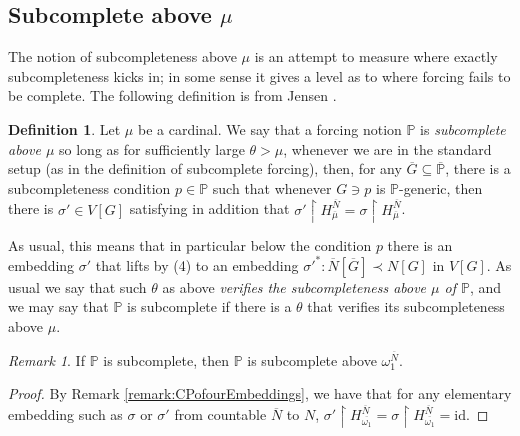 \documentclass{amsart}
\theoremstyle{definition}
\newtheorem{definition}[theorem]{Definition}
\theoremstyle{remark}
\newtheorem{remark}[theorem]{Remark}
\renewcommand{\P}{\mathbb{P}}
\newcommand{\N}{{\overline{N}}}
\newcommand{\G}{\overline{G}}
\newcommand{\rest}{\mathbin{\upharpoonright}}
\begin{document}
\subsection{Subcomplete above $\mu$}
The notion of subcompleteness above $\mu$ is an attempt to measure where exactly subcompleteness kicks in; in some sense it gives a level as to where forcing fails to be complete. The following definition is from Jensen \cite[Chapter 2 p.\ 47]{Jensen:2009fe}.
\begin{definition} 
Let $\mu$ be a cardinal. We say that a forcing notion $\P$ is \emph{subcomplete above $\mu$} so long as for sufficiently large $\theta > \mu$, whenever we are in the standard setup (as in the definition of subcomplete forcing),
then, for any $\G \subseteq \overline{\P}$, there is a subcompleteness condition $p \in \P$ such that whenever $G \ni p$ is $\P$-generic, then there is $\sigma' \in V[G]$ satisfying in addition that $\sigma' \rest H_{\overline \mu}^{\N} = \sigma \rest H_{\overline \mu}^{\N}$.

As usual, this means that in particular below the condition $p$ there is an embedding $\sigma'$ that lifts by (4) to an embedding $\sigma'^*:\N[\G] \prec N[G]$ in $V[G]$. As usual we say that such $\theta$ as above \textit{verifies the subcompleteness above $\mu$ of $\P$}, and we may say that $\P$ is subcomplete if there is a $\theta$ that verifies its subcompleteness above $\mu$.
\end{definition}

\begin{remark} If $\P$ is subcomplete, then $\P$ is subcomplete above $\omega_1^{\N}$. \end{remark}
\begin{proof} By Remark \ref{remark:CPofourEmbeddings}, we have that for any elementary embedding such as $\sigma$ or $\sigma'$ from countable $\N$ to $N$, $\sigma' \rest H_{\overline{\omega_1}}^{\N} = \sigma \rest H_{\overline{\omega_1}}^{\N} = \text{id}$. \end{proof}
\end{document}
